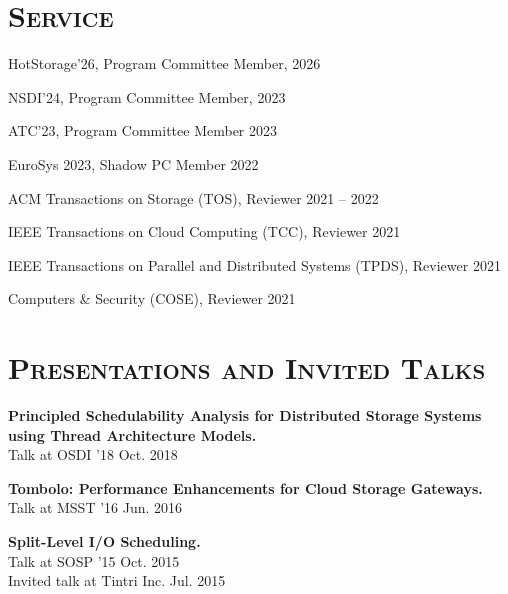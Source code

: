 \documentclass[10pt, letterpaper]{article}
\renewenvironment{itemize}{
  \begin{list}{}{
    \setlength{\leftmargin}{1.2em}
    \setlength{\itemsep}{0.12em}
    \setlength{\parskip}{0pt}
    \setlength{\parsep}{0.12em}
  }
}{
  \end{list}
}
\begin{document}
\section*{\textsc{Service}}
\begin{itemize}
        \item HotStorage'26, Program Committee Member, \hfill 2026
	\item NSDI'24, Program Committee Member, \hfill 2023
        \item ATC'23, Program Committee Member \hfill 2023
	\item EuroSys 2023, Shadow PC Member \hfill 2022
	\item ACM Transactions on Storage (TOS), Reviewer \hfill 2021 -- 2022
	\item IEEE Transactions on Cloud Computing (TCC), Reviewer \hfill 2021
        \item IEEE Transactions on Parallel and Distributed Systems (TPDS), Reviewer \hfill 2021
	\item Computers \& Security (COSE), Reviewer \hfill 2021
\end{itemize}

\section*{\textsc{Presentations and Invited Talks}}
\begin{itemize}
       \item {\bf{Principled Schedulability Analysis for Distributed Storage Systems using Thread Architecture Models.}} \\
        {\small{Talk at OSDI '18}} \hfill Oct. 2018

       \item {\bf{Tombolo: Performance Enhancements for Cloud Storage Gateways.}} \\
        {\small{Talk at MSST '16}}  \hfill Jun. 2016
       
       \item {\bf{Split-Level I/O Scheduling.}} \\
        {\small{Talk at SOSP '15}}  \hfill Oct. 2015\\
	{\small{Invited talk at Tintri Inc.}}	   \hfill Jul. 2015
\end{itemize}

\end{document}
